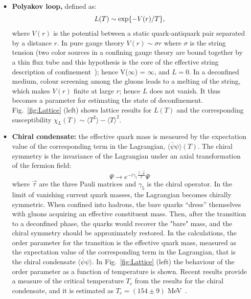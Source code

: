 \begin{itemize}
\item \textbf{Polyakov loop,} defined as:
\begin{equation}
L(T)\sim {\rm exp}\{-V(r)/T\},
\end{equation}
where $V(r)$ is the potential between a static quark-antiquark pair separated by a distance $r$. 
In pure gauge theory $V(r)\sim \sigma r$ where $\sigma$ is the string tension (two color sources 
in a confining gauge theory are bound together by a thin flux tube and this hypothesis is the
core of the effective string description of confinement~\cite{Caselle:2002vq}); hence V($\infty$) = $\infty$, 
and $L = 0$. In a deconfined medium, colour screening among the gluons leads to a melting of the 
string, which makes $V(r)$ finite at large $r$; hence $L$ does not vanish. It thus 
becomes a parameter for estimating the state of deconfinement. 
Fig.~\ref{fig:Lattice} (left) shows lattice results for $L(T)$ and the 
corresponding susceptibility $\chi_L(T)\sim \langle T^2 \rangle - \langle T \rangle ^2$. 
\item \textbf{Chiral condensate: }the effective quark mass is measured by the expectation value 
of the corresponding term in the Lagrangian, $\langle  \bar{\psi}\psi\rangle (T)$. 
The chiral symmetry is the invariance of the Lagrangian under an axial transformation of the fermion field:
\begin{equation}
\Psi \rightarrow e^{-i \gamma_{5} \frac{\vec{\tau} \cdot \vec{\theta}}{2}}\Psi
\end{equation}
where $\vec{\tau}$ are the three Pauli matrices and $\gamma_5$ 
is the chiral operator. In the limit of 
vanishing current quark masses, the Lagrangian becomes 
chirally symmetric. When confined into 
hadrons, the bare quarks ``dress'' themselves with gluons acquiring 
an effective constituent mass. 
Then, after the transition to a deconfined phase, the quarks 
would recover the "bare" mass, and the 
chiral symmetry should be approximately restored. In the calculations, 
the order parameter for the transition is the effective 
quark mass, measured as the expectation value of the corresponding 
term in the Lagrangian, that is the 
chiral condensate $\langle \overline{\psi}\psi \rangle$. In Fig.~\ref{fig:Lattice} 
(left) the behaviour of 
the order parameter as a function of temperature is shown. 
Recent results provide a measure of the critical temperature 
$T_c$ from the results for the chiral condensate, 
and it is estimated as $T_c = (154 \pm 9) $ MeV~\cite{Petreczky:2012rq}.

\end{itemize}
